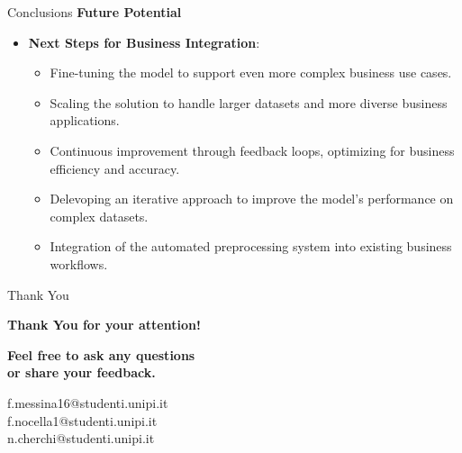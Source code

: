 \documentclass{beamer}
\begin{document}
\begin{frame}{Conclusions}
    \textbf{\textcolor{myBlue}{Future Potential}}
    \vspace{0.3cm}
    \begin{itemize}
        \item \textbf{Next Steps for Business Integration}: 
            \begin{itemize}
                \item Fine-tuning the model to support even more complex business use cases.
                \item Scaling the solution to handle larger datasets and more diverse business applications.
                \item Continuous improvement through feedback loops, optimizing for business efficiency and accuracy.
                \item Delevoping an iterative approach to improve the model's performance on complex datasets.
                \item Integration of the automated preprocessing system into existing business workflows.
            \end{itemize}
    \end{itemize}
\end{frame}

\begin{frame}{Thank You}
    \begin{center}
        \fontsize{20pt}{24pt}\selectfont\textbf{\textcolor{myBlue}{Thank You for your attention!}}\\
        \vspace{0.6cm}
        
        \fontsize{14pt}{18pt}\selectfont\textbf{\textcolor{myAccent}{Feel free to ask any questions}}\\
        \fontsize{14pt}{18pt}\selectfont\textbf{\textcolor{myAccent}{or share your feedback.}}\\
        \vspace{0.6cm}
        
        \fontsize{8pt}{11pt}\selectfont
        \textcolor{myBlue}{f.messina16@studenti.unipi.it}\\
        \textcolor{myBlue}{f.nocella1@studenti.unipi.it}\\
        \textcolor{myBlue}{n.cherchi@studenti.unipi.it}
    \end{center}
\end{frame}
\end{document}
